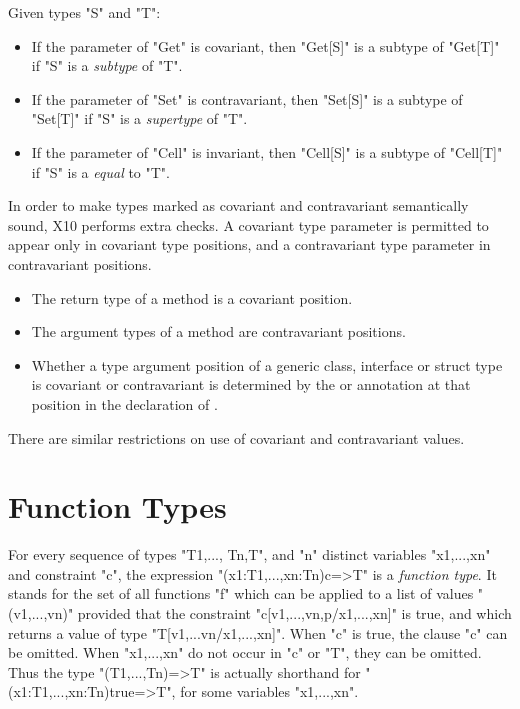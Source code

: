 Given types \xcd"S" and \xcd"T": 
\begin{itemize}
\item
If the parameter of \xcd"Get" is covariant, then
\xcd"Get[S]" is a subtype of \xcd"Get[T]" if
\xcd"S" is a {\em subtype} of \xcd"T".

\item
If the parameter of \xcd"Set" is contravariant, then
\xcd"Set[S]" is a subtype of \xcd"Set[T]" if
\xcd"S" is a {\em supertype} of \xcd"T".

\item
If the parameter of \xcd"Cell" is invariant, then
\xcd"Cell[S]" is a subtype of \xcd"Cell[T]" if
\xcd"S" is a {\em equal} to \xcd"T".
\end{itemize}


In order to make types marked as covariant and contravariant semantically
sound, X10 performs extra checks.  
A covariant type parameter is permitted to appear only in covariant type positions,
and a contravariant type parameter in contravariant positions. 
\begin{itemize}
\item The return type of a method is a covariant position.
\item The argument types of a method are contravariant positions.
\item Whether a type argument position of a generic class, interface or struct type 
is covariant or contravariant is determined by the \Xcd{+} or \Xcd{-} annotation
at that position in the declaration of .
\end{itemize}

There are similar restrictions on use of covariant and contravariant values. 


\section{Function Types}

For every sequence of types \xcd"T1,..., Tn,T", and \xcd"n" distinct variables
\xcd"x1,...,xn" and constraint \xcd"c", the expression
\xcd"(x1:T1,...,xn:Tn){c}=>T" is a \emph{function type}. It stands for
 the set of all functions \xcd"f" which can be applied to a
 list of values \xcd"(v1,...,vn)" provided that the constraint
 \xcd"c[v1,...,vn,p/x1,...,xn]" is true, and which returns a value of
 type \xcd"T[v1,...vn/x1,...,xn]". When \xcd"c" is true, the clause \xcd"{c}" can be
 omitted. When \xcd"x1,...,xn" do not occur in \xcd"c" or \xcd"T", they can be
 omitted. Thus the type \xcd"(T1,...,Tn)=>T" is actually shorthand for
 \xcd"(x1:T1,...,xn:Tn){true}=>T", for some variables \xcd"x1,...,xn".





